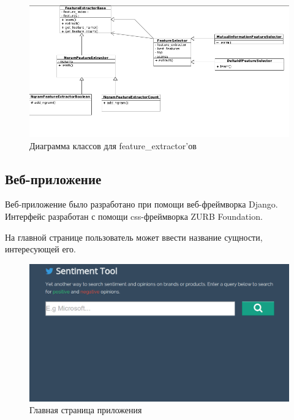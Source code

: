 \begin{figure}[!Ht]
\begin{center}
\includegraphics[scale=0.4, trim=0mm 0mm 0mm 0mm, clip]{../resources/uml/diag2.png}
\caption{Диаграмма классов для feature\_extractor'ов}
\label{gr:extractors}
\end{center}
\end{figure} 

\newpage
\subsection{Веб-приложение}
Веб-приложение было разработано при помощи веб-фреймворка Django.
Интерфейс разработан с помощи css-фреймворка ZURB Foundation.

На главной странице пользователь может ввести название
сущности, интересующей его. 
\begin{figure}[!ht]
\begin{center}
\includegraphics[scale=0.4, trim=0mm 0mm 0mm 0mm, clip]{../resources/screens/1.png}
\caption{Главная страница приложения}
\label{gr:mainpage}
\end{center}
\end{figure} 


